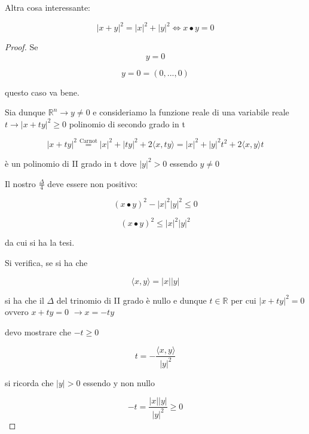 \documentclass[11pt]{article}
\begin{document}
Altra cosa interessante:

 \[
    |x+y|^{2}= |x|^{2} + |y|^{2} \Leftrightarrow x\bullet y  =0
 \]




 \begin{proof}
     Se
     \[
        y=0
     \]

     \[
         y=0=(0,...,0) 
     \]
     
     questo caso va bene.

     Sia dunque $\mathbb{R}^{n} \rightarrow y \neq 0$ e consideriamo la funzione reale di una variabile reale $t \rightarrow |x+ty|^{2}\ge 0$ polinomio di secondo grado in t

     \[
         |x + ty| ^{2} \overset{\text{Carnot}}{=} |x|^{2} + |ty|^{2} + 2\langle x,ty \rangle  = |x|^{2} + |y|^{2}t^{2} + 2 \langle x,y \rangle t
     \]

     è un polinomio di II grado in t dove $|y|^{2}> 0 $ essendo $y \neq 0$

     Il nostro $\frac{\Delta}{4}$ deve essere non positivo:

     \[
         (x\bullet y ) ^{2} - |x| ^{2}|y|^{2} \le 0
     \]

     \[
         (x\bullet y ) ^{2}\le  |x| ^{2}|y|^{2} 
     \]

     da cui si ha la tesi.

     Si verifica, se si ha che

     \[
         \langle x,y \rangle = |x| |y|
     \]

     si ha che il $\Delta$ del trinomio di II grado è nullo e dunque $t \in \mathbb{R}$ per cui $|x+ty|^{2}=0$ ovvero $x +ty=0$ $\rightarrow x=-ty$

     devo mostrare che $-t \ge 0$


     \[
         t = - \frac{\langle x,y \rangle}{|y|^{2}}
     \]

     si ricorda che $|y|>0$ essendo y non nullo

     \[
         -t = \frac{|x| |y|}{|y|^{2}}\ge 0
     \]

 \end{proof}
\end{document}
